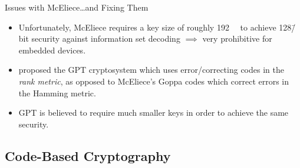 \documentclass[usepdftitle=false]{beamer}
\begin{document}
\begin{frame}{Issues with McEliece}{\ldots{}and Fixing Them}
  \begin{itemize}
  \item Unfortunately, McEliece requires a key size of roughly
    \SI{192}{\kilo\byte} to achieve \num{128}\=/bit security against
    information set decoding \(\implies\) very prohibitive for
    embedded devices.
  \item {} proposed the GPT cryptosystem which uses
    error\-/correcting codes in the \emph{rank metric}, as opposed to
    McEliece's Goppa codes which correct errors in the Hamming metric.
  \item GPT is believed to require much smaller keys in order to
    achieve the same security.
  \end{itemize}
\end{frame}

\subsection{Code-Based Cryptography}
\end{document}
